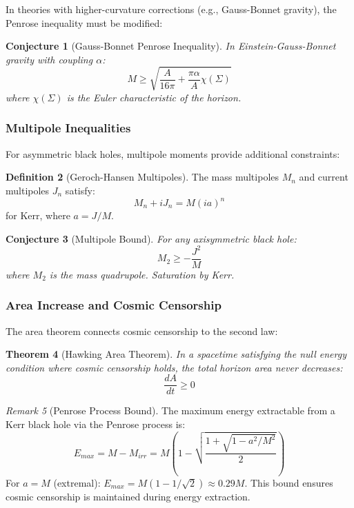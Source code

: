 \documentclass[12pt]{article}
\theoremstyle{plain}
\newtheorem{theorem}{Theorem}[section]
\newtheorem{conjecture}[theorem]{Conjecture}
\theoremstyle{definition}
\newtheorem{definition}[theorem]{Definition}
\theoremstyle{remark}
\newtheorem{remark}[theorem]{Remark}
\begin{document}
In theories with higher-curvature corrections (e.g., Gauss-Bonnet gravity), the Penrose inequality must be modified:

\begin{conjecture}[Gauss-Bonnet Penrose Inequality]
In Einstein-Gauss-Bonnet gravity with coupling $\alpha$:
\begin{equation}
M \geq \sqrt{\frac{A}{16\pi} + \frac{\pi \alpha}{A}\chi(\Sigma)}
\end{equation}
where $\chi(\Sigma)$ is the Euler characteristic of the horizon.
\end{conjecture}

\subsubsection{Multipole Inequalities}

For asymmetric black holes, multipole moments provide additional constraints:

\begin{definition}[Geroch-Hansen Multipoles]
The mass multipoles $M_n$ and current multipoles $J_n$ satisfy:
\begin{equation}
M_n + iJ_n = M(ia)^n
\end{equation}
for Kerr, where $a = J/M$.
\end{definition}

\begin{conjecture}[Multipole Bound]
For any axisymmetric black hole:
\begin{equation}
M_2 \geq -\frac{J^2}{M}
\end{equation}
where $M_2$ is the mass quadrupole. Saturation by Kerr.
\end{conjecture}

\subsubsection{Area Increase and Cosmic Censorship}

The area theorem connects cosmic censorship to the second law:

\begin{theorem}[Hawking Area Theorem]
In a spacetime satisfying the null energy condition where cosmic censorship holds, the total horizon area never decreases:
\begin{equation}
\frac{dA}{dt} \geq 0
\end{equation}
\end{theorem}

\begin{remark}[Penrose Process Bound]
The maximum energy extractable from a Kerr black hole via the Penrose process is:
\begin{equation}
E_{max} = M - M_{irr} = M\left(1 - \sqrt{\frac{1 + \sqrt{1 - a^2/M^2}}{2}}\right)
\end{equation}
For $a = M$ (extremal): $E_{max} = M(1 - 1/\sqrt{2}) \approx 0.29M$. This bound ensures cosmic censorship is maintained during energy extraction.
\end{remark}
\end{document}
